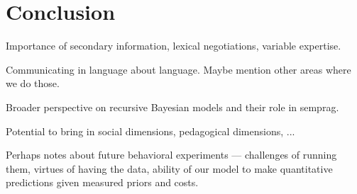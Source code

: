 \documentclass{article}
\begin{document}


\section{Conclusion}\label{sec:conclusion}

Importance of secondary information, lexical negotiations, variable
expertise.

Communicating in language about language. Maybe mention other areas
where we do those.

Broader perspective on recursive Bayesian models and their role in
semprag.

Potential to bring in social dimensions, pedagogical dimensions, ...

Perhaps notes about future behavioral experiments --- challenges of
running them, virtues of having the data, ability of our model to make
quantitative predictions given measured priors and costs.




\end{document}

